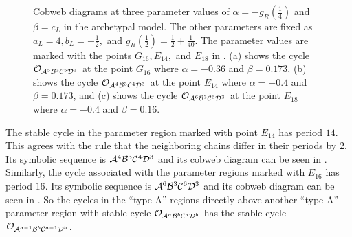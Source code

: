 \begin{figure}
	\centering
	\caption[Cobweb diagrams of the archetypal model]{
		Cobweb diagrams at three parameter values of $\alpha = -g_R\left(\frac{1}{4}\right)$ and $\beta = c_L$ in the archetypal model.
		The other parameters are fixed as $a_L = 4, b_L = -\frac{1}{2},$ and $g_R\left(\frac{1}{2}\right) = \frac{1}{2} + \frac{1}{40}$.
		The parameter values are marked with the points $G_{16}, E_{14},$ and $E_{18}$ in .
		(a) shows the cycle $\mathcal{O}_{\mathcal{A}^5\mathcal{B}^3\mathcal{C}^5\mathcal{D}^3}$ at the point $G_{16}$ where $\alpha = -0.36$ and $\beta = 0.173$,
		(b) shows the cycle $\mathcal{O}_{\mathcal{A}^4\mathcal{B}^3\mathcal{C}^4\mathcal{D}^3}$ at the point $E_{14}$ where $\alpha = -0.4$ and $\beta = 0.173$,
		and (c) shows the cycle $\mathcal{O}_{\mathcal{A}^6\mathcal{B}^3\mathcal{C}^6\mathcal{D}^3}$ at the point $E_{18}$ where $\alpha = -0.4$ and $\beta = 0.16$.
	}
	\label{fig:arch.dyn.cobwebs.3}
\end{figure}

The stable cycle in the parameter region marked with point $E_{14}$ has period $14$.
This agrees with the rule that the neighboring chains differ in their periods by 2.
Its symbolic sequence is $\mathcal{A}^4\mathcal{B}^3\mathcal{C}^4\mathcal{D}^3$ and its cobweb diagram can be seen in .
Similarly, the cycle associated with the parameter regions marked with $E_{16}$ has period $16$.
Its symbolic sequence is $\mathcal{A}^6\mathcal{B}^3\mathcal{C}^6\mathcal{D}^3$ and its cobweb diagram can be seen in .
So the cycles in the ``type A'' regions directly above another ``type A'' parameter region with stable cycle $\mathcal{O}_{\mathcal{A}^a\mathcal{B}^b\mathcal{C}^a\mathcal{D}^b}$ has the stable cycle $\mathcal{O}_{\mathcal{A}^{a-1}\mathcal{B}^b\mathcal{C}^{a-1}\mathcal{D}^b}$.

